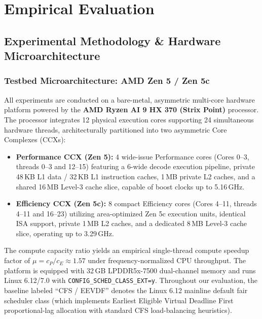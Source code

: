 \documentclass[conference]{IEEEtran}
\begin{document}
\section{Empirical Evaluation}
\label{sec:evaluation}

\subsection{Experimental Methodology \& Hardware Microarchitecture}
\label{sec:testbed_hardware}

\subsubsection{Testbed Microarchitecture: AMD Zen 5 / Zen 5c}
All experiments are conducted on a bare-metal, asymmetric multi-core hardware platform powered by the \textbf{AMD Ryzen AI 9 HX 370 (Strix Point)} processor. The processor integrates 12 physical execution cores supporting 24 simultaneous hardware threads, architecturally partitioned into two asymmetric Core Complexes (CCXs):
\begin{itemize}\setlength{\itemsep}{1pt}\setlength{\parskip}{0pt}
    \item \textbf{Performance CCX (Zen 5):} 4 wide-issue Performance cores (Cores 0--3, threads 0--3 and 12--15) featuring a 6-wide decode execution pipeline, private 48\,KB L1 data / 32\,KB L1 instruction caches, 1\,MB private L2 caches, and a shared 16\,MB Level-3 cache slice, capable of boost clocks up to 5.16\,GHz.
    \item \textbf{Efficiency CCX (Zen 5c):} 8 compact Efficiency cores (Cores 4--11, threads 4--11 and 16--23) utilizing area-optimized Zen 5c execution units, identical ISA support, private 1\,MB L2 caches, and a dedicated 8\,MB Level-3 cache slice, operating up to 3.29\,GHz.
\end{itemize}
The compute capacity ratio yields an empirical single-thread compute speedup factor of $\mu = c_P / c_E \approx 1.57$ under frequency-normalized CPU throughput. The platform is equipped with 32\,GB LPDDR5x-7500 dual-channel memory and runs Linux 6.12/7.0 with \texttt{CONFIG\_SCHED\_CLASS\_EXT=y}. Throughout our evaluation, the baseline labeled ``CFS / EEVDF'' denotes the Linux 6.12 mainline default fair scheduler class (which implements Earliest Eligible Virtual Deadline First proportional-lag allocation with standard CFS load-balancing heuristics).
\end{document}

